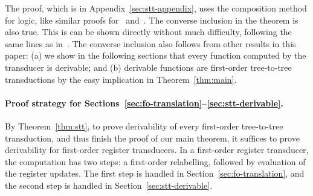 The proof, which is in Appendix~\ref{sec:stt-appendix}, uses the composition method for logic,  like similar proofs for~\cite[Theorem 4.6]{alur2017streaming} and~\cite[Theorem 14]{bloem_comparison_2000}. 
The converse  inclusion in the  theorem is also true. This is can be shown directly without much difficulty, following the same lines as in~\cite[Section 5]{bloem_comparison_2000}. The converse inclusion also follows from   other results in this paper: (a) we show in the following sections that every function computed by the transducer is derivable; and (b)  derivable functions are first-order tree-to-tree transductions by the easy implication in Theorem~\ref{thm:main}.

\paragraph*{Proof strategy for Sections~\ref{sec:fo-translation}--\ref{sec:stt-derivable}.} By Theorem~\ref{thm:stt}, to prove derivability of  every first-order tree-to-tree transduction, and thus finish the proof of our main theorem, it suffices to prove derivability for first-order register transducers. In a first-order register transducer,  the computation  has two steps: a first-order relabelling, followed by evaluation of the register updates. The first step is handled in Section~\ref{sec:fo-translation}, and the second step is handled in Section~\ref{sec:stt-derivable}.







